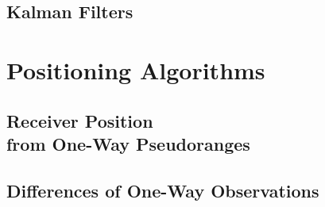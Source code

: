 \documentclass[a4paper,12pt]{book}
\begin{document}
	\chapter{Kalman Filters}
	\minitoc %
	\newpage%
		
		
		
		
		
		
		
		
		
		
		
		
		
	
	
\part{Positioning Algorithms}
	\chapter{Receiver Position \\from One-Way Pseudoranges}
	\minitoc %
	\newpage%
		
		
		
		
		
		
		
		
		
		
	
	\chapter{Differences of One-Way Observations}
	\minitoc %
	\newpage%
		
		
		
		
		
		
		
		
		
	
\end{document}
